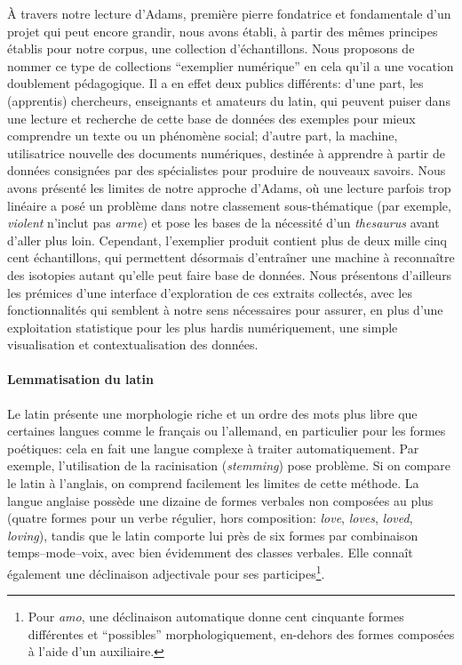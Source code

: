 À travers notre lecture d'Adams, première pierre fondatrice et fondamentale d'un projet qui peut encore grandir, nous avons établi, à partir des mêmes principes établis pour notre corpus, une collection d'échantillons. Nous proposons de nommer ce type de collections \enquote{exemplier numérique} en cela qu'il a une vocation doublement pédagogique. Il a en effet deux publics différents: d'une part, les (apprentis) chercheurs, enseignants et amateurs du latin, qui peuvent puiser dans une lecture et recherche de cette base de données des exemples pour mieux comprendre un texte ou un phénomène social; d'autre part, la machine, utilisatrice nouvelle des documents numériques, destinée à apprendre à partir de données consignées par des spécialistes pour produire de nouveaux savoirs. Nous avons présenté les limites de notre approche d'Adams, où une lecture parfois trop linéaire a posé un problème dans notre classement sous-thématique (par exemple, \textit{violent} n'inclut pas \textit{arme}) et pose les bases de la nécessité d'un \textit{thesaurus} avant d'aller plus loin. Cependant, l'exemplier produit contient plus de deux mille cinq cent échantillons, qui permettent désormais d'entraîner une machine à reconnaître des isotopies autant qu'elle peut faire base de données. Nous présentons d'ailleurs les prémices d'une interface d'exploration de ces extraits collectés, avec les fonctionnalités qui semblent à notre sens nécessaires pour assurer, en plus d'une exploitation statistique pour les plus hardis numériquement, une simple visualisation et contextualisation des données.

\paragraph{Lemmatisation du latin}

Le latin présente une morphologie riche et un ordre des mots plus libre que certaines langues comme le français ou l'allemand, en particulier pour les formes poétiques: cela en fait une langue complexe à traiter automatiquement. Par exemple, l'utilisation de la racinisation (\textit{stemming}) pose problème. Si on compare le latin à l'anglais, on comprend facilement les limites de cette méthode. La langue anglaise possède une dizaine de formes verbales non composées au plus (quatre formes pour un verbe régulier, hors composition: \textit{love}, \textit{loves}, \textit{loved}, \textit{loving}), tandis que le latin comporte lui près de six formes par combinaison temps--mode--voix, avec bien évidemment des classes verbales. Elle connaît également une déclinaison adjectivale pour ses participes\footnote{Pour \textit{amo}, une déclinaison automatique donne cent cinquante formes différentes et \enquote{possibles} morphologiquement, en-dehors des formes composées à l'aide d'un auxiliaire.}.

